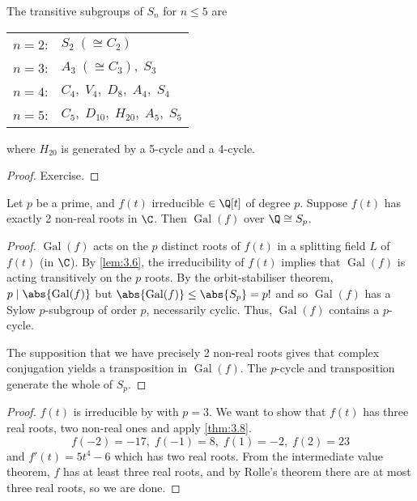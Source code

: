 \documentclass{article}
\DeclareMathOperator{\Gal}{Gal}
\begin{document}
\begin{nlemma}\label{lem:3.7}
    The transitive subgroups of $S_n$ for $n \leq 5$ are
    \begin{center}
        \begin{tabular}{rl}
            $n=2$:  & $S_2 \; (\cong C_2)$ \\
            $n=3$:  & $A_3 \; (\cong C_3), \; S_3$ \\
            $n=4$:  & $C_4, \; V_4, \; D_8, \; A_4, \; S_4$ \\
            $n=5$:  & $C_5, \; D_{10}, \; H_{20}, \; A_5, \; S_5$\\
        \end{tabular}
    \end{center}
    where $H_{20}$ is generated by a 5-cycle and a 4-cycle.
\end{nlemma}
\begin{proof}
    Exercise.
\end{proof}
\begin{nthm}\label{thm:3.8}
    Let $p$ be a prime, and $f(t)$ irreducible $\in \Q[t]$ of degree $p$.
    Suppose $f(t)$ has exactly 2 non-real roots in $\C$.
    Then $\Gal(f)$ over $\Q \cong S_p$.
\end{nthm}
\begin{proof}
    $\Gal(f)$ acts on the $p$ distinct roots of $f(t)$ in a splitting field $L$ of $f(t)$ (in $\C$).
    By \cref{lem:3.6}, the irreducibility of $f(t)$ implies that $\Gal(f)$ is acting transitively on the $p$ roots.
    By the orbit-stabiliser theorem, $p \mid \abs{\Gal(f)}$ but $\abs{\Gal(f)} \leq \abs{S_p} = p!$ and so $\Gal(f)$ has a Sylow $p$-subgroup of order $p$, necessarily cyclic.
    Thus, $\Gal(f)$ contains a $p$-cycle.

    The supposition that we have precisely 2 non-real roots gives that complex conjugation yields a transposition in $\Gal(f)$.
    The $p$-cycle and transposition generate the whole of $S_p$.
\end{proof}

\begin{proof}
    $f(t)$ is irreducible by  with $p=3$.
    We want to show that $f(t)$ has three real roots, two non-real ones and apply \cref{thm:3.8}.
    \begin{equation*}
        f(-2) = -17, \; f(-1) = 8, \; f(1) = -2, \; f(2) = 23
    \end{equation*}
    and $f'(t) = 5t^4 - 6$ which has two real roots.
    From the intermediate value theorem, $f$ has at least three real roots, and by Rolle's theorem there are at most three real roots, so we are done.
\end{proof}
\end{document}
